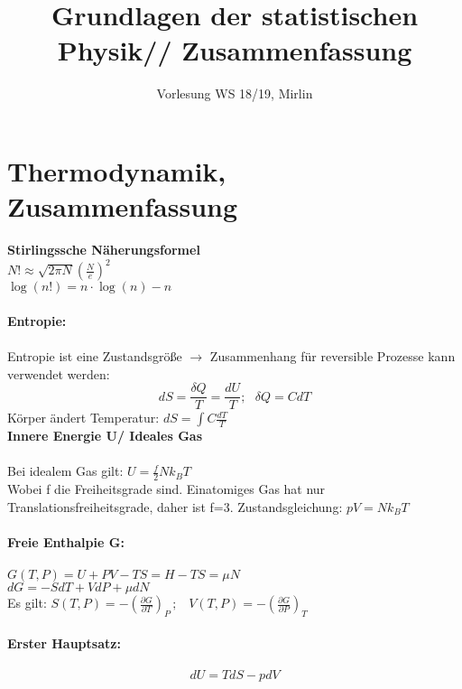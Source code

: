 \documentclass[a4paper,11pt]{scrartcl}
\begin{document}
\begin{titlepage}


\title{Grundlagen der statistischen Physik// Zusammenfassung}

\date{Vorlesung WS 18/19, Mirlin}

\vfill
\maketitle
\end{titlepage}
\newpage
\tableofcontents
\newpage

\section{Thermodynamik, Zusammenfassung}
\textbf{Stirlingssche Näherungsformel}\\
$N! \approx \sqrt{2 \pi N} \left( \frac{N}{e} \right)^2$
\\
$\log(n!)= n \cdot \log(n) - n$\\
\\
\textbf{Entropie:}\\
\\
Entropie ist eine Zustandsgröße $\rightarrow$ Zusammenhang für reversible Prozesse kann verwendet werden:\\
\begin{equation}
 dS = \frac{\delta Q }{T} = \frac{dU}{T} ; \,\,\,\, \delta Q = C dT
\end{equation}
Körper ändert Temperatur: $ dS = \int C \frac{dT}{T}$ \\

\textbf{Innere Energie U/ Ideales Gas}\\
\\
Bei idealem Gas gilt: $ U = \frac{f}{2} N k_B T$\\
Wobei f die Freiheitsgrade sind. Einatomiges Gas hat nur Translationsfreiheitsgrade, daher ist f=3. 
Zustandsgleichung: $ pV = Nk_B T$\\
\\
\textbf{Freie Enthalpie G:}\\
\\
$G(T,P) = U +PV-TS = H-TS = \mu N$\\
$dG = -SdT + VdP + \mu dN$\\
Es gilt: $ S(T,P)= - \left( \frac{\partial G }{ \partial T} \right)_P\, ; \,\,\,\,\, V(T,P)= - \left( \frac{\partial G }{ \partial P} \right)_T$\\
\\
\textbf{Erster Hauptsatz:}\\
\\
$$ dU = T dS -pdV$$
\end{document}

